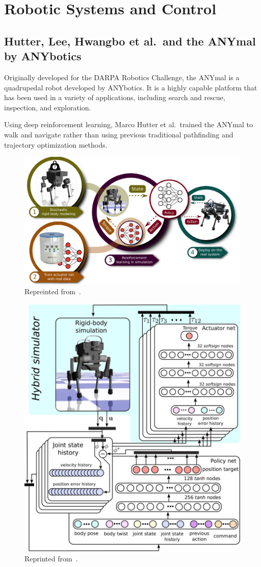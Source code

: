 \documentclass[12pt]{report}
\theoremstyle{definition}
\theoremstyle{remark}
\begin{document}
\chapter{Robotic Systems and Control}

\section{Hutter, Lee, Hwangbo et al.\ and the ANYmal by ANYbotics}
Originally developed for the DARPA Robotics Challenge, the ANYmal is a quadrupedal robot developed by ANYbotics. It is a highly capable platform that has been used in a variety of applications, including search and rescue, inspection, and exploration.

Using deep reinforcement learning, Marco Hutter et al.\ trained the ANYmal to walk and navigate rather than using previous traditional pathfinding and trajectory optimization methods.

\begin{figure}[h]
    \centering
    \includegraphics[width=\linewidth]{figs/anymal_RL.png}
    \caption{Repreinted from~\cite{hwangbo_learning_2019}.}
    \label{fig:enter-label}
\end{figure}

\begin{figure}[h]
    \centering
    \includegraphics[width=0.5\linewidth]{figs/anymal_detailed.png}
    \caption{Reprinted from~\cite{hwangbo_learning_2019}.}
    \label{fig:enter-label}
\end{figure}
\end{document}
